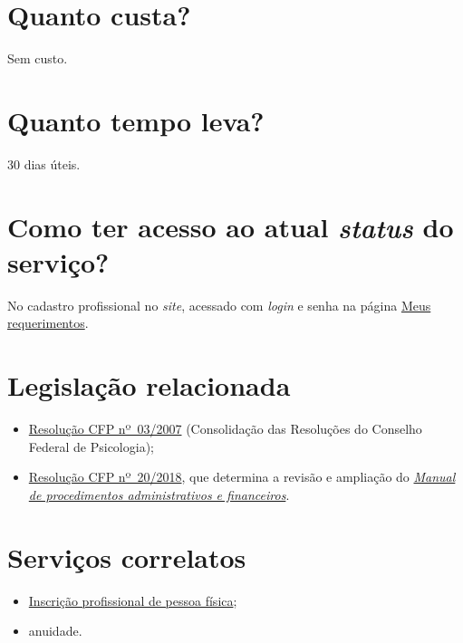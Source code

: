 \section{Quanto custa?}

Sem custo.

\section{Quanto tempo leva?}

30 dias úteis.

\section{Como ter acesso ao atual \emph{status} do serviço?}

No cadastro profissional no \emph{site}, acessado com \emph{login} e senha na página \href{https://cfpsp.brctotal.com/crp06_servicosonline/pgsRequerimento/Requerimentos.aspx}{Meus requerimentos}.

\section{Legislação relacionada}

\begin{itemize}
  \item  \href{https://atosoficiais.com.br/cfp/resolucao-administrativa-financeira-n-3-2007-institui-a-consolidacao-das-resolucoes-do-conselho-federal-de-psicologia?origin=instituicao&q=resolu\%C3\%A7\%C3\%A3o\%203/2007}{Resolução  CFP nº~03/2007} (Consolidação das Resoluções do Conselho Federal de  Psicologia);
  \item  \href{https://transparencia.cfp.org.br/wp-content/uploads/sites/7/2020/05/Manual-de-Procedimentos-Administrativos-e-Financeiro-CFP-RES-20.2018.pdf}{\href{https://atosoficiais.com.br/cfp/resolucao-administrativa-financeira-n-20-2018-altera-o-manual-de-procedimentos-administrativo-e-financeiro-do-sistema-conselhos-de-psicologia-anexo-da-resolucao-cfp-n-202018-a-resolucao-cfp-n-03-2007-a-resolucao-cfp-n-16-2019-e-da-outras-providencias}{Resolução  CFP nº~20/2018}}, que determina a revisão e ampliação do  \href{https://transparencia.cfp.org.br/wp-content/uploads/sites/7/2020/05/Manual-de-Procedimentos-Administrativos-e-Financeiro-CFP-RES-20.2018.pdf}{\emph{Manual  de procedimentos administrativos e financeiros}}.
\end{itemize}

\section{Serviços correlatos}

\begin{itemize}
  \item  \hyperref[chap:pf-inscricao]{Inscrição  profissional de pessoa física};
  \item  anuidade.
\end{itemize}

\sumario